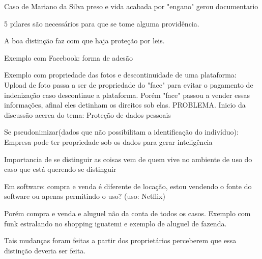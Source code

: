 \documentclass[12pt]{article}
\begin{document}
Caso de Mariano da Silva preso e vida acabada por "engano" gerou documentario

5 pilares são necessários para que se tome alguma providência.

A boa distinção faz com que haja proteção por leis.

Exemplo com Facebook: forma de adesão

Exemplo com propriedade das fotos e descontinuidade de uma plataforma:
Upload de foto passa a ser de propriedade do "face" para evitar o pagamento
de indenização caso descontinue a plataforma. Porém "face" passou a vender
essas informações, afinal eles detinham os direitos sob elas. PROBLEMA.
Inicio da discussão acerca do tema: Proteção de dados pessoais

Se pseudonimizar(dados que não possibilitam a identificação do indivíduo):
Empresa pode ter propriedade sob os dados para gerar inteligência

Importancia de se distinguir as coisas vem de quem vive no ambiente de uso do
caso que está querendo se distinguir

Em software: compra e venda é diferente de locação, estou vendendo o fonte do
software ou apenas permitindo o uso? (uso: Netflix)

Porém compra e venda e aluguel não da conta de todos os casos. Exemplo com
funk estralando no shopping iguatemi e exemplo de aluguel de fazenda.

Tais mudanças foram feitas a partir dos proprietários perceberem que essa
distinção deveria ser feita.
 
\end{document}
